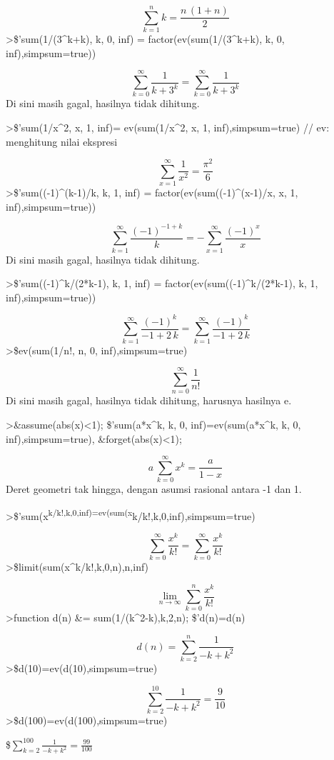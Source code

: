 \documentclass[
]{book}
\begin{document}
\[\sum_{k=1}^{n}{k}=\frac{n\,\left(1+n\right)}{2}\]\textgreater\$'sum(1/(3\^{}k+k), k, 0, inf) = factor(ev(sum(1/(3\^{}k+k), k, 0, inf),simpsum=true))

\[\sum_{k=0}^{\infty }{\frac{1}{k+3^{k}}}=\sum_{k=0}^{\infty }{\frac{
 1}{k+3^{k}}}\]Di sini masih gagal, hasilnya tidak dihitung.

\textgreater\$'sum(1/x\^{}2, x, 1, inf)= ev(sum(1/x\^{}2, x, 1, inf),simpsum=true) // ev: menghitung nilai ekspresi

\[\sum_{x=1}^{\infty }{\frac{1}{x^2}}=\frac{\pi^2}{6}\]\textgreater\$'sum((-1)\^{}(k-1)/k, k, 1, inf) = factor(ev(sum((-1)\^{}(x-1)/x, x, 1, inf),simpsum=true))

\[\sum_{k=1}^{\infty }{\frac{\left(-1\right)^{-1+k}}{k}}=-\sum_{x=1
 }^{\infty }{\frac{\left(-1\right)^{x}}{x}}\]Di sini masih gagal, hasilnya tidak dihitung.

\textgreater\$'sum((-1)\^{}k/(2*k-1), k, 1, inf) = factor(ev(sum((-1)\^{}k/(2*k-1), k, 1, inf),simpsum=true))

\[\sum_{k=1}^{\infty }{\frac{\left(-1\right)^{k}}{-1+2\,k}}=\sum_{k=1
 }^{\infty }{\frac{\left(-1\right)^{k}}{-1+2\,k}}\]\textgreater\$ev(sum(1/n!, n, 0, inf),simpsum=true)

\[\sum_{n=0}^{\infty }{\frac{1}{n!}}\]Di sini masih gagal, hasilnya tidak dihitung, harusnya hasilnya e.

\textgreater\&assume(abs(x)\textless1); \$'sum(a*x\^{}k, k, 0, inf)=ev(sum(a*x\^{}k, k, 0, inf),simpsum=true), \&forget(abs(x)\textless1);

\[a\,\sum_{k=0}^{\infty }{x^{k}}=\frac{a}{1-x}\]Deret geometri tak hingga, dengan asumsi rasional antara -1 dan 1.

\textgreater\$'sum(x\textsuperscript{k/k!,k,0,inf)=ev(sum(x}k/k!,k,0,inf),simpsum=true)

\[\sum_{k=0}^{\infty }{\frac{x^{k}}{k!}}=\sum_{k=0}^{\infty }{\frac{x
^{k}}{k!}}\]\textgreater\$limit(sum(x\^{}k/k!,k,0,n),n,inf)

\[\lim_{n\rightarrow \infty }{\sum_{k=0}^{n}{\frac{x^{k}}{k!}}}\]\textgreater function d(n) \&= sum(1/(k\^{}2-k),k,2,n); \$'d(n)=d(n)

\[d\left(n\right)=\sum_{k=2}^{n}{\frac{1}{-k+k^2}}\]\textgreater\$d(10)=ev(d(10),simpsum=true)

\[\sum_{k=2}^{10}{\frac{1}{-k+k^2}}=\frac{9}{10}\]\textgreater\$d(100)=ev(d(100),simpsum=true)

\$\(\sum_{k=2}^{100}{\frac{1}{-k+k^2}}=\frac{99}{100}\)
\end{document}
